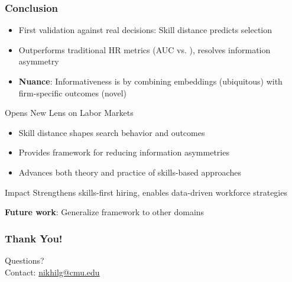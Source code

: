 \documentclass[11pt,xcolor={dvipsnames},hyperref={pdftex,pdfpagemode=UseNone,hidelinks,pdfdisplaydoctitle=true},usepdftitle=false]{beamer}
\begin{document}
\begin{frame}
\frametitle{Conclusion}
\begin{itemize}
\item First validation against real decisions: Skill distance predicts selection
\item Outperforms traditional HR metrics (AUC  vs. ), resolves information asymmetry
\item \textbf{Nuance}: Informativeness is  by combining embeddings (ubiquitous) with firm-specific outcomes (novel)
\end{itemize}

\begin{block}{Opens New Lens on Labor Markets}
\begin{itemize}
\item Skill distance shapes search behavior and outcomes
\item Provides framework for reducing information asymmetries
\item Advances both theory and practice of skills-based approaches
\end{itemize}
\end{block}

\begin{block}{Impact}
Strengthens skills-first hiring, enables data-driven workforce strategies
\end{block}

\textbf{Future work}: Generalize framework to other domains
\end{frame}

\lastslide

\begin{frame}
\frametitle{Thank You!}
\begin{center}
\LARGE Questions?\\
\vspace{1cm}
\normalsize
Contact: \url{nikhilg@cmu.edu}
\end{center}
\end{frame}
\end{document}
